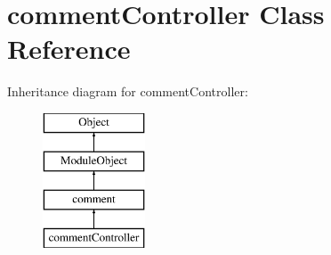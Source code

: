 \hypertarget{classcommentController}{\section{comment\+Controller Class Reference}
\label{classcommentController}
}
Inheritance diagram for comment\+Controller\+:\begin{figure}[H]
\begin{center}
\leavevmode
\includegraphics[height=4.000000cm]{classcommentController}
\end{center}
\end{figure}
